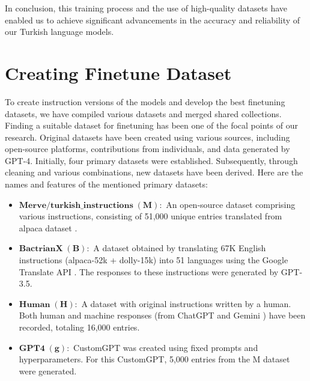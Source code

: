 \documentclass[conference]{IEEEtran}
\begin{document}
In conclusion, this training process and the use of high-quality datasets have enabled us to achieve significant advancements in the accuracy and reliability of our Turkish language models.

\section{Creating Finetune Dataset}
To create instruction versions of the models and develop the best finetuning datasets, we have compiled various datasets and merged shared collections.
Finding a suitable dataset for finetuning has been one of the focal points of our research. Original datasets have been created using various sources, including open-source platforms, contributions from individuals, and data generated by GPT-4\cite{achiam2023gpt}. Initially, four primary datasets were established. Subsequently, through cleaning and various combinations, new datasets have been derived. Here are the names and features of the mentioned primary datasets:

\vspace{0.25\baselineskip}

\small{

    \begin{itemize}
    
    \item $\mathbf{Merve/turkish\_instructions \; ( M ) :}$ An open-source dataset comprising various instructions, consisting of 51,000 unique entries\cite{merveturkishinstructions} translated from alpaca dataset \cite{alpaca}.
    
    \vspace{0.5\baselineskip}
    
    \item $\mathbf{BactrianX \; ( B ) :}$ A dataset obtained by translating 67K English instructions (alpaca-52k + dolly-15k) into 51 languages using the Google Translate API \cite{li2023bactrianx}. The responses to these instructions were generated by GPT-3.5.
    
    \vspace{0.5\baselineskip}
    
    \item $\mathbf{Human \; ( H ) :}$ A dataset with original instructions written by a human. Both human and machine responses (from ChatGPT and Gemini \cite{team2023gemini}) have been recorded, totaling 16,000 entries.
    
    \vspace{0.5\baselineskip}
    
    \item $\mathbf{GPT4 \; ( g ) :}$ CustomGPT was created using fixed prompts and hyperparameters. For this CustomGPT, 5,000 entries from the M dataset were generated.
    
    \end{itemize}
}
\vspace{0.25\baselineskip}
\end{document}
